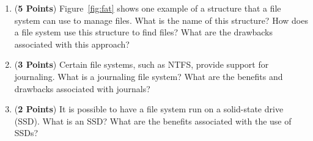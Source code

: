 \documentclass[12pt,epsf,psfig,graphics]{article}
\begin{document}
\begin{enumerate}
\begin{enumerate}

  \item ({\bf 5 Points}) Figure~\ref{fig:fat} shows one example of a structure that a file system can use to manage
    files.  What is the name of this structure? How does a file system use this structure to find files?  What are the
    drawbacks associated with this approach?

  \item ({\bf 3 Points}) Certain file systems, such as NTFS, provide support for journaling.  What is a
    journaling file system?  What are the benefits and drawbacks associated with journals?

  \item ({\bf 2 Points}) It is possible to have a file system run on a solid-state drive (SSD).  What is an SSD?  What
    are the benefits associated with the use of SSDs? 

\end{enumerate}

\end{enumerate}
\end{document}
